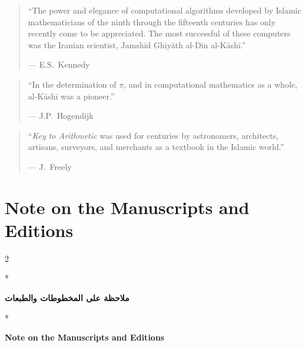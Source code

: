 \documentclass[11pt,a4paper]{article}
\newcommand{\ar}[1]{\arabicfont\beginR #1\endR}
\newenvironment{bilingual}{%
  \vspace{0.3em}%
  \begin{paracol}{2}%
}{%
  \end{paracol}%
  \vspace{0.3em}%
}
\begin{document}
\vspace{0.3cm}

\begin{quote}
``The power and elegance of computational algorithms developed by
Islamic mathematicians of the ninth through the fifteenth centuries
has only recently come to be appreciated. The most successful of
these computers was the Iranian scientist, Jamsh\=id Ghiy\=ath al-D\=in
al-K\=ash\=i.''
\begin{flushright}
--- E.S.\ Kennedy
\end{flushright}
\end{quote}

\vspace{0.3cm}

\begin{quote}
``In the determination of $\pi$, and in computational mathematics
as a whole, al-K\=ash\=i was a pioneer.''
\begin{flushright}
--- J.P.\ Hogendijk
\end{flushright}
\end{quote}

\vspace{0.3cm}

\begin{quote}
``\textit{Key to Arithmetic} was used for centuries by astronomers,
architects, artisans, surveyors, and merchants as a textbook in the
Islamic world.''
\begin{flushright}
--- J.\ Freely
\end{flushright}
\end{quote}
\clearpage

\section{Note on the Manuscripts and Editions}
\label{app:manuscripts}

\begin{bilingual}
\switchcolumn[0]*
\begin{center}
\textbf{\Large\color{chapcolor}\ar{ملاحظة على المخطوطات والطبعات}}
\end{center}
\switchcolumn[1]*
\begin{center}
\textbf{\Large\color{chapcolor}Note on the Manuscripts and Editions}
\end{center}
\end{bilingual}
\end{document}
